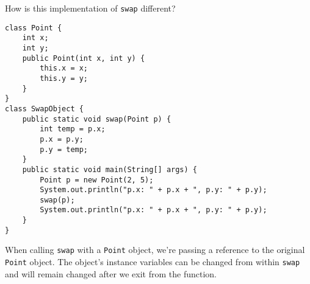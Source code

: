 \question How is this implementation of \texttt{swap} different?

\begin{lstlisting}
class Point {
    int x;
    int y;
    public Point(int x, int y) {
        this.x = x;
        this.y = y;
    }
}
class SwapObject {
    public static void swap(Point p) {
        int temp = p.x;
        p.x = p.y;
        p.y = temp;
    }
    public static void main(String[] args) {
        Point p = new Point(2, 5);
        System.out.println("p.x: " + p.x + ", p.y: " + p.y);
        swap(p);
        System.out.println("p.x: " + p.x + ", p.y: " + p.y);
    }
}
\end{lstlisting}

\begin{solution}[0.25in]
When calling \texttt{swap} with a \texttt{Point} object, we're passing a reference to the original \texttt{Point} object. The object's instance variables can be changed from within \texttt{swap} and will remain changed after we exit from the function.
\end{solution}